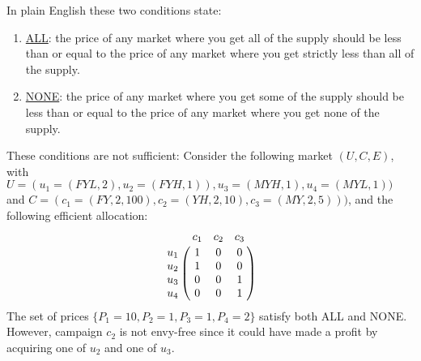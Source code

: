 \documentclass[12pt,letterpaper]{article}
\newcommand{\Campaign}{c}
\newcommand{\Campaigns}{C}
\newcommand{\User}{u}
\newcommand{\Users}{U}
\newcommand{\Edges}{E}
\begin{document}
In plain English these two conditions state:

\begin{enumerate}
 \item \underline{ALL}: the price of any market where you get all of the supply should be less than or equal to the price of any market where you get strictly less than all of the supply.
 \item \underline{NONE}: the price of any market where you get some of the supply should be less than or equal to the price of any market where you get none of the supply.
\end{enumerate}

These conditions are not sufficient: Consider the following market $(\Users,\Campaigns,\Edges)$, with 
     $\Users =(\User_1 = (FYL, 2), \User_2 = (FYH, 1)), \User_3 = (MYH, 1), \User_4 = (MYL,1))$ 
and  $\Campaigns =(\Campaign_1 = (FY, 2, 100),\Campaign_2 = (YH, 2, 10), \Campaign_3 = (MY, 2, 5)))$, and the following efficient allocation:
\[
		\bordermatrix{&		\Campaign_1 & \Campaign_2& \Campaign_3\cr
                	\User_1	& 1 		&  0 		& 0 	\cr
                	\User_2	& 1  		&  0		& 0 	\cr
                	\User_3	& 0  		&  0		& 1 	\cr
                	\User_4	& 0		&  0		& 1 	}
	\]
  The set of prices $\{P_1 = 10, P_2 = 1, P_3 = 1, P_4 = 2\}$ satisfy both ALL and NONE. However, campaign $\Campaign_{2}$ is not envy-free since it could have made a 
  profit by acquiring one of $\User_{2}$ and one of $\User_{3}$.
\end{document}
